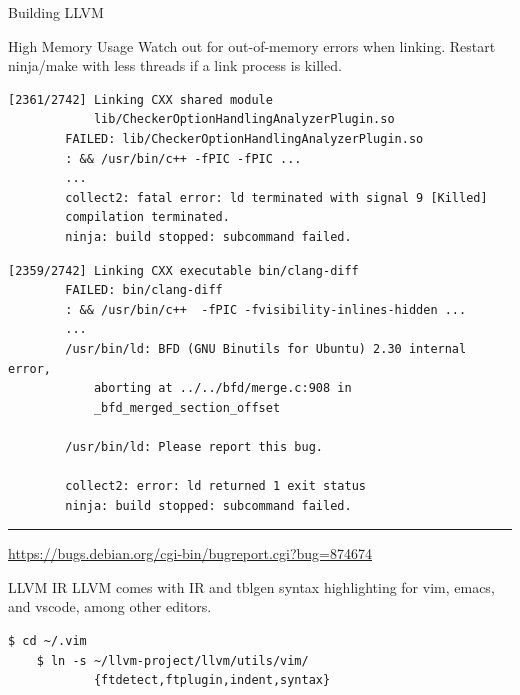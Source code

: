 \documentclass{beamer}
\begin{document}
\begin{frame}[fragile]{Building LLVM}
    \begin{alertblock}{High Memory Usage}
        Watch out for out-of-memory errors when linking. Restart ninja/make with less threads if a link process is killed.
    \end{alertblock}

    \vspace{-2ex}

    \begin{overprint}
        \begin{lstlisting}[gobble=8]
        [2361/2742] Linking CXX shared module
            lib/CheckerOptionHandlingAnalyzerPlugin.so
        FAILED: lib/CheckerOptionHandlingAnalyzerPlugin.so
        : && /usr/bin/c++ -fPIC -fPIC ...
        ...
        collect2: fatal error: ld terminated with signal 9 [Killed]
        compilation terminated.
        ninja: build stopped: subcommand failed.
        \end{lstlisting}

        \begin{lstlisting}[gobble=8]
        [2359/2742] Linking CXX executable bin/clang-diff
        FAILED: bin/clang-diff
        : && /usr/bin/c++  -fPIC -fvisibility-inlines-hidden ...
        ...
        /usr/bin/ld: BFD (GNU Binutils for Ubuntu) 2.30 internal error,
            aborting at ../../bfd/merge.c:908 in
            _bfd_merged_section_offset

        /usr/bin/ld: Please report this bug.

        collect2: error: ld returned 1 exit status
        ninja: build stopped: subcommand failed.
        \end{lstlisting}

        \vspace{-2ex}
        \rule{3cm}{0.5pt}

        {\footnotesize \url{https://bugs.debian.org/cgi-bin/bugreport.cgi?bug=874674}}
    \end{overprint}
\end{frame}


\begin{frame}[fragile]{LLVM IR}
    LLVM comes with IR and tblgen syntax highlighting for vim, emacs, and vscode, among other editors.

    \vspace{1cm}

    \begin{lstlisting}[gobble=4]
    $ cd ~/.vim
    $ ln -s ~/llvm-project/llvm/utils/vim/
            {ftdetect,ftplugin,indent,syntax}
    \end{lstlisting}
\end{frame}
\end{document}
